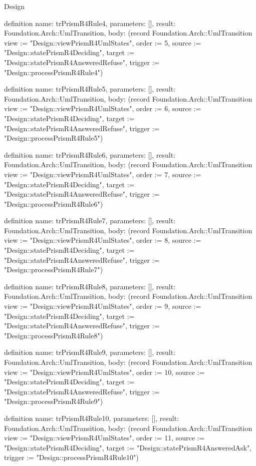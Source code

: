 \begin{lexlean}{Design}
\begin{semanticmodule}
definition{
  name: trPrismR4Rule4,
  parameters: [],
  result: Foundation.Arch::UmlTransition,
  body: (record Foundation.Arch::UmlTransition {view := "Design::viewPrismR4UmlStates", order := 5, source := "Design::statePrismR4Deciding", target := "Design::statePrismR4AnsweredRefuse", trigger := "Design::processPrismR4Rule4"})
}

definition{
  name: trPrismR4Rule5,
  parameters: [],
  result: Foundation.Arch::UmlTransition,
  body: (record Foundation.Arch::UmlTransition {view := "Design::viewPrismR4UmlStates", order := 6, source := "Design::statePrismR4Deciding", target := "Design::statePrismR4AnsweredRefuse", trigger := "Design::processPrismR4Rule5"})
}

definition{
  name: trPrismR4Rule6,
  parameters: [],
  result: Foundation.Arch::UmlTransition,
  body: (record Foundation.Arch::UmlTransition {view := "Design::viewPrismR4UmlStates", order := 7, source := "Design::statePrismR4Deciding", target := "Design::statePrismR4AnsweredRefuse", trigger := "Design::processPrismR4Rule6"})
}

definition{
  name: trPrismR4Rule7,
  parameters: [],
  result: Foundation.Arch::UmlTransition,
  body: (record Foundation.Arch::UmlTransition {view := "Design::viewPrismR4UmlStates", order := 8, source := "Design::statePrismR4Deciding", target := "Design::statePrismR4AnsweredRefuse", trigger := "Design::processPrismR4Rule7"})
}

definition{
  name: trPrismR4Rule8,
  parameters: [],
  result: Foundation.Arch::UmlTransition,
  body: (record Foundation.Arch::UmlTransition {view := "Design::viewPrismR4UmlStates", order := 9, source := "Design::statePrismR4Deciding", target := "Design::statePrismR4AnsweredRefuse", trigger := "Design::processPrismR4Rule8"})
}

definition{
  name: trPrismR4Rule9,
  parameters: [],
  result: Foundation.Arch::UmlTransition,
  body: (record Foundation.Arch::UmlTransition {view := "Design::viewPrismR4UmlStates", order := 10, source := "Design::statePrismR4Deciding", target := "Design::statePrismR4AnsweredRefuse", trigger := "Design::processPrismR4Rule9"})
}

definition{
  name: trPrismR4Rule10,
  parameters: [],
  result: Foundation.Arch::UmlTransition,
  body: (record Foundation.Arch::UmlTransition {view := "Design::viewPrismR4UmlStates", order := 11, source := "Design::statePrismR4Deciding", target := "Design::statePrismR4AnsweredAsk", trigger := "Design::processPrismR4Rule10"})
}


\end{semanticmodule}
\end{lexlean}
